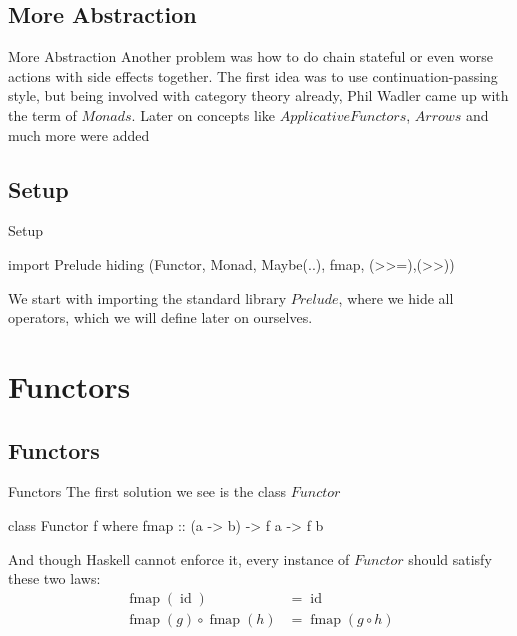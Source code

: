 \documentclass{beamer}
\DeclareMathOperator{\id}{id}
\DeclareMathOperator{\fmap}{fmap}
\begin{document}
\subsection{More Abstraction}
\begin{frame}[fragile]{More Abstraction}
Another problem was how to do chain stateful or even worse actions with side
effects together. The first idea was to use continuation-passing style, but
being involved with category theory already, Phil Wadler came up with the term
of $Monads$. Later on concepts like $Applicative Functors$, $Arrows$ and much
more were added
\end{frame}

\subsection{Setup}
\begin{frame}[fragile]{Setup}
\begin{code}
    import Prelude hiding (Functor, Monad, Maybe(..), fmap, (>>=),(>>))
\end{code}
We start with importing the standard library $Prelude$, where we hide all
operators, which we will define later on ourselves.
\end{frame}

\section{Functors} %
\label{sec:functors}

\subsection{Functors}
\begin{frame}[fragile]{Functors}
The first solution we see is the class $Functor$
\begin{code}
    class Functor f where
        fmap :: (a -> b) -> f a -> f b
\end{code}
And though Haskell cannot enforce it, every instance of $Functor$ should satisfy
these two laws:
\begin{align*}
                               \fmap(\id)&= \id\\
                      \fmap(g) ∘ \fmap(h)&= \fmap (g ∘ h)
\end{align*}
\end{frame}
\end{document}
